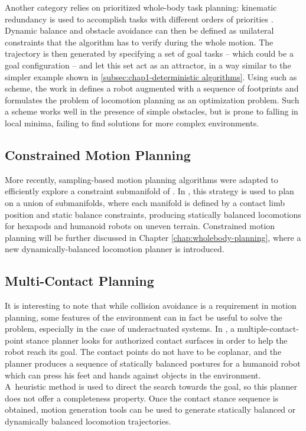 Another category relies on prioritized whole-body task planning:
kinematic redundancy is used to accomplish tasks with different orders
of priorities \cite{khatib2004wbd, saab-tro-12}. Dynamic balance and
obstacle avoidance can then be defined as unilateral constraints that
the algorithm has to verify during the whole motion. The trajectory is
then generated by specifying a set of goal tasks -- which could be a
goal configuration -- and let this set act as an attractor, in a way
similar to the simpler example shown in
\ref{subsec:chap1-deterministic algorithms}. Using such as scheme, the
work in \cite{kano09} defines a robot augmented with a sequence of
footprints and formulates the problem of locomotion planning as an
optimization problem. Such a scheme works well in the presence of
simple obstacles, but is prone to falling in local minima, failing to
find solutions for more complex environments.

\subsection{Constrained Motion Planning}
\label{subsec:chap1-constrained-motion-planning}

More recently, sampling-based motion planning algorithms were adapted
to efficiently explore a constraint submanifold of {\cspace}. In
\cite{bretl2006motion, haus10}, this strategy is used to plan on a
union of submanifolds, where each manifold is defined by a contact
limb position and static balance constraints, producing statically
balanced locomotions for hexapods and humanoid robots on uneven
terrain. Constrained motion planning will be further discussed in
Chapter \ref{chap:wholebody-planning}, where a new
dynamically-balanced locomotion planner is introduced.

\subsection{Multi-Contact Planning}
\label{subsec-chap1-multi-contact-planning}

It is interesting to note that while collision avoidance is a
requirement in motion planning, some features of the environment can
in fact be useful to solve the problem, especially in the case of
underactuated systems. In \cite{bouy12, escande2013planning}, a
multiple-contact-point stance planner looks for authorized contact
surfaces in order to help the robot reach its goal. The contact points
do not have to be coplanar, and the planner produces a sequence of
statically balanced postures for a humanoid robot which can press his
feet and hands against objects in the environment. A~heuristic method
is used to direct the search towards the goal, so this planner does
not offer a completeness property. Once the contact stance sequence is
obtained, motion generation tools can be used to generate
statically balanced or dynamically balanced locomotion trajectories.

